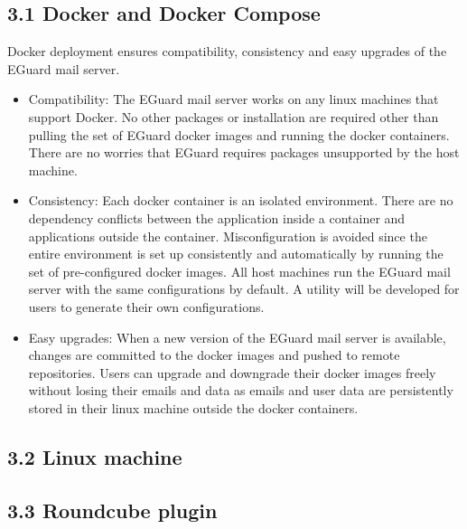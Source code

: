 \documentclass[11pt]{article}
\begin{document}
\subsection*{3.1 \hspace{10pt} Docker and Docker Compose}
Docker deployment ensures compatibility, consistency and easy upgrades of the EGuard mail server.
\begin{itemize}

\item Compatibility: The EGuard mail server works on any linux machines that support Docker. No other packages or installation are required other than pulling the set of EGuard docker images and running the docker containers. There are no worries that EGuard requires packages unsupported by the host machine.

\item Consistency: Each docker container is an isolated environment. There are no dependency conflicts between the application inside a container and applications outside the container. Misconfiguration is avoided since the entire environment is set up consistently and automatically by running the set of pre-configured docker images. All host machines run the EGuard mail server with the same configurations by default. A utility will be developed for users to generate their own configurations.

\item Easy upgrades: When a new version of the EGuard mail server is available, changes are committed to the docker images and pushed to remote repositories. Users can upgrade and downgrade their docker images freely without losing their emails and data as emails and user data are persistently stored in their linux machine outside the docker containers.

\end{itemize}



\subsection*{3.2 \hspace{10pt} Linux machine}

\subsection*{3.3 \hspace{10pt} Roundcube plugin}
\end{document}
